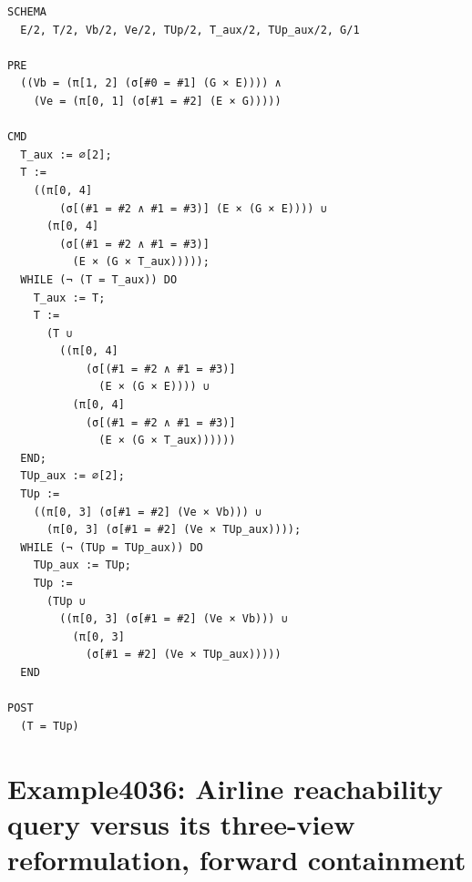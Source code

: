 \documentclass[10pt]{article}
\begin{document}
\begin{Verbatim}[fontsize=\tiny,breaklines=true,breakanywhere=true,frame=single,framesep=1.5mm]
SCHEMA
  E/2, T/2, Vb/2, Ve/2, TUp/2, T_aux/2, TUp_aux/2, G/1

PRE
  ((Vb = (π[1, 2] (σ[#0 = #1] (G × E)))) ∧
    (Ve = (π[0, 1] (σ[#1 = #2] (E × G)))))

CMD
  T_aux := ∅[2];
  T :=
    ((π[0, 4]
        (σ[(#1 = #2 ∧ #1 = #3)] (E × (G × E)))) ∪
      (π[0, 4]
        (σ[(#1 = #2 ∧ #1 = #3)]
          (E × (G × T_aux)))));
  WHILE (¬ (T = T_aux)) DO
    T_aux := T;
    T :=
      (T ∪
        ((π[0, 4]
            (σ[(#1 = #2 ∧ #1 = #3)]
              (E × (G × E)))) ∪
          (π[0, 4]
            (σ[(#1 = #2 ∧ #1 = #3)]
              (E × (G × T_aux))))))
  END;
  TUp_aux := ∅[2];
  TUp :=
    ((π[0, 3] (σ[#1 = #2] (Ve × Vb))) ∪
      (π[0, 3] (σ[#1 = #2] (Ve × TUp_aux))));
  WHILE (¬ (TUp = TUp_aux)) DO
    TUp_aux := TUp;
    TUp :=
      (TUp ∪
        ((π[0, 3] (σ[#1 = #2] (Ve × Vb))) ∪
          (π[0, 3]
            (σ[#1 = #2] (Ve × TUp_aux)))))
  END

POST
  (T = TUp)
\end{Verbatim}

\Needspace{0.45\textheight}

\section{Example4036: Airline reachability query versus its three-view reformulation, forward containment}\label{case:Example4036}
\end{document}

